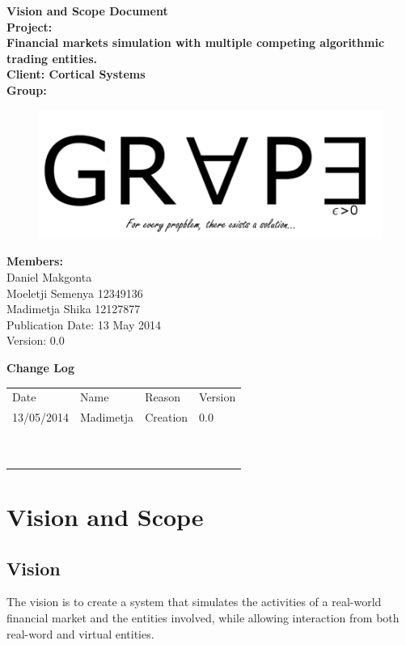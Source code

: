 \documentclass[12pt]{article}
\newcommand{\Title}{Vision and Scope Document} %
\begin{document}
	\begin{center}%
		\LARGE \bf \Title \\[3em]
		\Large {Project:}\\
		Financial markets simulation with multiple competing algorithmic trading entities.\\[0.7em]
		\Large {Client:}
		Cortical Systems\\[2em]
		\LARGE {\bf Group:}\\
			\begin{figure}[ht!]
				\centering
				\includegraphics[scale=0.4]{Logo8.png}
			\end{figure}
			
		\Large {\bf Members:}\\[0.3em]
		\large
		Daniel Makgonta \\
		Moeletji Semenya 12349136\\
		Madimetja Shika 12127877\\[3em]
	
	\small Publication Date: 13 May 2014\\[0.5em]
	\small Version: 0.0 		    
	\end{center}%
	
	\newpage		
	\LARGE 
 	{\bf Change Log}\\[1em]
	\begin{tabular}{llll}
		Date & Name & Reason & Version \\
		13/05/2014 & Madimetja & Creation & 0.0 \\
		~ & ~ & ~ & ~ \\
		~ & ~ & ~ & ~ \\
	\end{tabular}
	

	
	\newpage
	\tableofcontents
				  
	\newpage
	\section{Vision and Scope}
		\subsection{Vision}
		The vision is to create a system that simulates the activities of a real-world financial market and the entities involved, while allowing interaction from both real-word and virtual entities.
		
\end{document}

